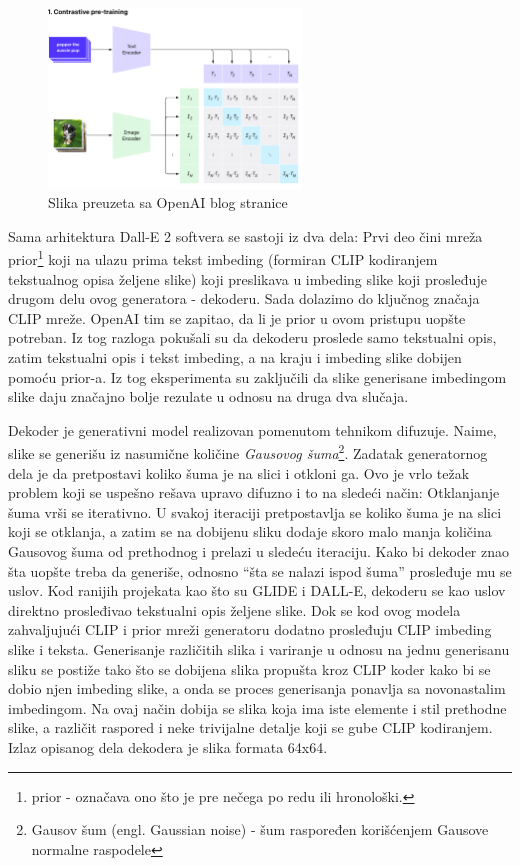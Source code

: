\documentclass[12pt, letterpaper]{article}
\begin{document}
\begin{figure}[htp]
\centering
\includegraphics[width=0.6\textwidth]{clip.png}
\caption{Slika preuzeta sa OpenAI blog stranice}
\label{fig: clipslika}
\end{figure}

\pagebreak

Sama arhitektura Dall-E 2 softvera se sastoji iz dva dela: Prvi deo čini mreža prior\footnote{prior - označava ono što je pre nečega po redu ili hronološki.} koji na ulazu prima tekst imbeding (formiran CLIP kodiranjem tekstualnog opisa željene slike) koji preslikava u imbeding slike koji prosleđuje drugom delu ovog generatora - dekoderu. Sada dolazimo do ključnog značaja CLIP mreže. OpenAI tim se zapitao, da li je prior u ovom pristupu uopšte potreban. Iz tog razloga pokušali su da dekoderu proslede samo tekstualni opis, zatim tekstualni opis i tekst imbeding, a na kraju i imbeding slike dobijen pomoću prior-a. Iz tog eksperimenta su zaključili da slike generisane imbedingom slike daju značajno bolje rezulate u odnosu na druga dva slučaja.\cite{openai_dali}

Dekoder je generativni model realizovan pomenutom tehnikom difuzuje. Naime, slike se generišu iz nasumične količine \textit{Gausovog šuma}\footnote{Gausov šum (engl. Gaussian noise) - šum raspoređen korišćenjem Gausove normalne raspodele}. Zadatak generatornog dela je da pretpostavi koliko šuma je na slici i otkloni ga. Ovo je vrlo težak problem koji se uspešno rešava upravo difuzno i to na sledeći način: Otklanjanje šuma vrši se iterativno\cite{gen1}. U svakoj iteraciji pretpostavlja se koliko šuma je na slici koji se otklanja, a zatim se na dobijenu sliku dodaje skoro malo manja količina Gausovog šuma od prethodnog i prelazi u sledeću iteraciju. Kako bi dekoder znao šta uopšte treba da generiše, odnosno “šta se nalazi ispod šuma” prosleđuje mu se uslov. Kod ranijih projekata kao što su GLIDE i DALL-E\cite{openai_glide, openai_dali}, dekoderu se kao uslov direktno prosleđivao tekstualni opis željene slike. Dok se kod ovog modela zahvaljujući CLIP i prior mreži generatoru dodatno prosleđuju CLIP imbeding slike i teksta. Generisanje različitih slika i variranje u odnosu na jednu generisanu sliku se postiže tako što se dobijena slika propušta kroz CLIP koder kako bi se dobio njen imbeding slike, a onda se proces generisanja ponavlja sa novonastalim imbedingom. Na ovaj način dobija se slika koja ima iste elemente i stil prethodne slike, a različit raspored i neke trivijalne detalje koji se gube CLIP kodiranjem. Izlaz opisanog dela dekodera je slika formata 64x64.
\end{document}
